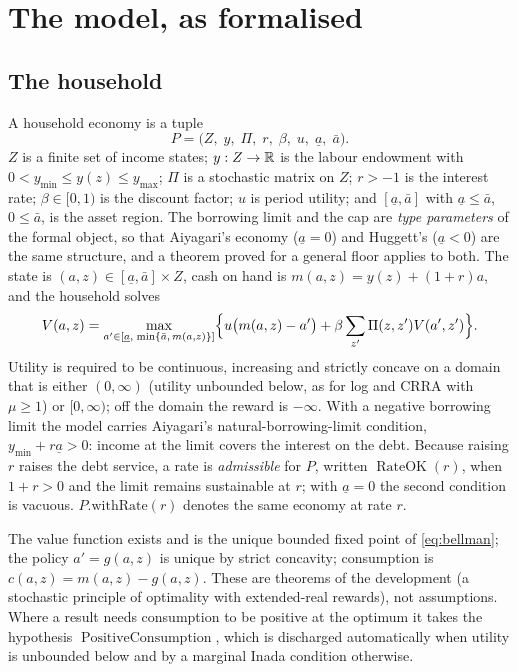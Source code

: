 \section{The model, as formalised}\label{sec:model}

\subsection{The household}

A household economy is a tuple
\[
  P=\bigl(Z,\;y,\;\Pi,\;r,\;\beta,\;u,\;\underline a,\;\bar a\bigr).
\]
$Z$ is a finite set of income states; $y:Z\to\mathbb{R}$ is the labour endowment with
$0<y_{\min}\le y(z)\le y_{\max}$; $\Pi$ is a stochastic matrix on $Z$; $r>-1$ is the interest rate;
$\beta\in[0,1)$ is the discount factor; $u$ is period utility; and $[\underline a,\bar a]$ with
$\underline a\le\bar a$, $0\le \bar a$, is the asset region. The borrowing limit and the cap are
\emph{type parameters} of the formal object, so that Aiyagari's economy ($\underline a=0$) and
Huggett's ($\underline a<0$) are the same structure, and a theorem proved for a general floor
applies to both. The state is $(a,z)\in[\underline a,\bar a]\times Z$, cash on hand is
$m(a,z)=y(z)+(1+r)a$, and the household solves
\begin{equation}\label{eq:bellman}
  V(a,z)=\max_{a'\in[\underline a,\;\min\{\bar a,\,m(a,z)\}]}
  \Bigl\{u\bigl(m(a,z)-a'\bigr)+\beta\sum_{z'}\Pi(z,z')V(a',z')\Bigr\}.
\end{equation}
Utility is required to be continuous, increasing and strictly concave on a domain that is either
$(0,\infty)$ (utility unbounded below, as for log and CRRA with $\mu\ge1$) or $[0,\infty)$; off the
domain the reward is $-\infty$. With a negative borrowing limit the model carries Aiyagari's
natural-borrowing-limit condition, $y_{\min}+r\underline a>0$: income at the limit covers the
interest on the debt. Because raising $r$ raises the debt service, a rate is \emph{admissible}
for $P$, written $\operatorname{RateOK}(r)$, when $1+r>0$ and the limit remains sustainable at $r$;
with $\underline a=0$ the second condition is vacuous. $P.\text{withRate}(r)$ denotes the same
economy at rate $r$.

The value function exists and is the unique bounded fixed point of \eqref{eq:bellman}; the policy
$a'=g(a,z)$ is unique by strict concavity; consumption is $c(a,z)=m(a,z)-g(a,z)$. These are
theorems of the development (a stochastic principle of optimality with extended-real rewards), not
assumptions. Where a result needs consumption to be positive at the optimum it takes the hypothesis
$\operatorname{PositiveConsumption}$, which is discharged automatically when utility is unbounded
below and by a marginal Inada condition otherwise.

